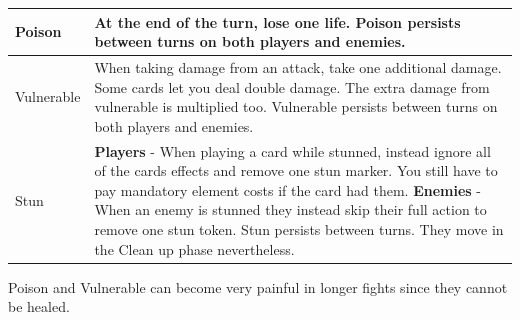 \begin{longtable}{|p{2.5cm}|p{13.7cm}|}
	
	\hline
	Poison \symPoison & At the end of the turn, lose one life. Poison persists between turns on both players and enemies.\\
	\hline
	Vulnerable \symVulnerable & When taking damage from an attack, take one additional damage. Some cards let you deal double damage. The extra damage from vulnerable is multiplied too. Vulnerable persists between turns on both players and enemies. \\
	\hline
	Stun \symStun & \textbf{Players} - When playing a card while stunned, instead ignore all of the cards effects and remove one stun marker. You still have to pay mandatory element costs if the card had them. \hspace*{12cm} \linebreak \textbf{Enemies} - When an enemy is stunned they instead skip their full action to remove one stun token. Stun persists between turns. They move in the Clean up phase nevertheless.\\
	\hline
	
	
	
\end{longtable}


\begin{tcolorbox}[colframe=black, colback=white]
	Poison and Vulnerable can become very painful in longer fights since they cannot be healed. 
\end{tcolorbox}
